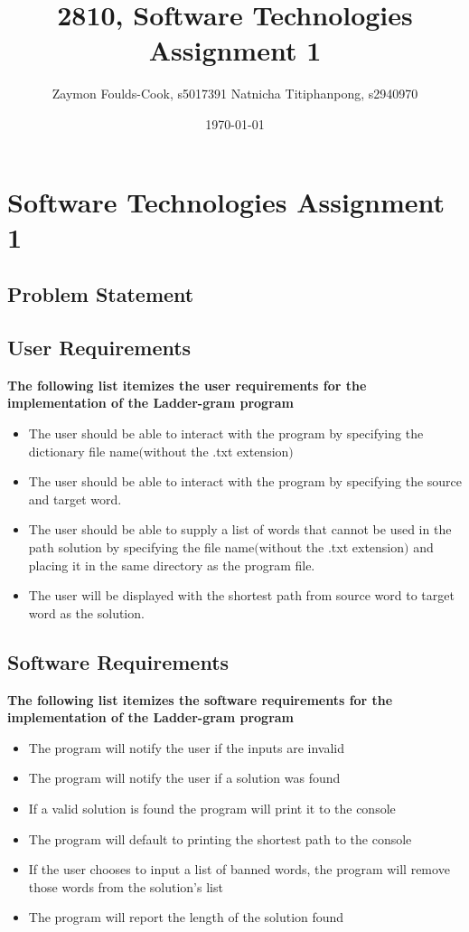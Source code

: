 \documentclass[12pt, a4]{report}
\title{2810, Software Technologies Assignment 1}
\author{Zaymon Foulds-Cook, s5017391 \textbar{} Natnicha Titiphanpong, s2940970}%
\date{\today}
\begin{document}
\begin{titlepage}
	\maketitle
\end{titlepage}
 \tableofcontents
\pagebreak
\section{Software Technologies Assignment 1}
\subsection{Problem Statement}
	\par 
	
\subsection{User Requirements}
	\textbf{The following list itemizes the user requirements for the implementation of the Ladder-gram program}
	\begin{itemize}
		\item The user should be able to interact with the program by specifying the dictionary file name$($without the .txt extension$)$
		\item The user should be able to interact with the program by specifying the source and target word.
		\item The user should be able to supply a list of words that cannot be used in the path solution by specifying the file name$($without the .txt extension$)$ and placing it in the same directory as the program file.
		\item The user will be displayed with the shortest path from source word to target word as the solution.
	\end{itemize}
	
\subsection{Software Requirements}
	\textbf{The following list itemizes the software requirements for the implementation of the Ladder-gram program}
	\begin{itemize}
		\item The program will notify the user if the inputs are invalid
		\item The program will notify the user if a solution was found
		\item If a valid solution is found the program will print it to the console
		\item The program will default to printing the shortest path to the console
		\item If the user chooses to input a list of banned words, the program will remove those words from the solution's list
		\item The program will report the length of the solution found 
	\end{itemize}
	\pagebreak
	
\end{document}
